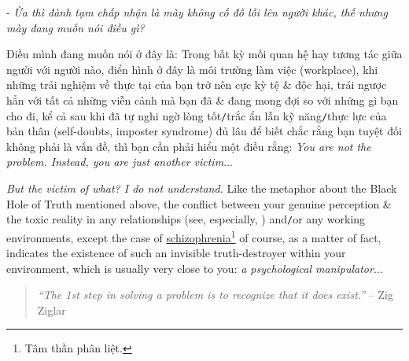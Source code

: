 \documentclass[12pt,twoside]{book}
\begin{document}
- {\it Ừa thì đành tạm chấp nhận là mày không cố đỗ lỗi lên người khác, thế nhưng mày đang muốn nói điều gì?}

Điều mình đang muốn nói ở đây là: Trong bất kỳ mối quan hệ hay tương tác giữa người với người nào, điển hình ở đây là môi trường làm việc (workplace), khi những trải nghiệm về thực tại của bạn trở nên cực kỳ tệ \& độc hại, trái ngược hẳn với tất cả những viễn cảnh mà bạn đã \& đang mong đợi so với những gì bạn cho đi, kể cả sau khi đã tự nghi ngờ lòng tốt{\tt/}trắc ẩn lẫn kỹ năng{\tt/}thực lực của bản thân (self-doubts, imposter syndrome) đủ lâu để biết chắc rằng bạn tuyệt đối không phải là vấn đề, thì bạn cần phải hiểu một điều rằng: {\it You are not the problem. Instead, you are just another victim}$\ldots$

{\it But the victim of what? I do not understand.} Like the metaphor about the Black Hole of Truth mentioned above, the conflict between your genuine perception \& the toxic reality in any relationships (see, especially, \cite{Bancroft_why_he_do,Bancroft_why_he_do_VN}) and{\tt/}or any working environments, except the case of \href{https://en.wikipedia.org/wiki/Schizophrenia}{schizophrenia}\footnote{Tâm thần phân liệt.} of course, as a matter of fact, indicates the existence of such an invisible truth-destroyer within your environment, which is usually very close to you: {\it a psychological manipulator}$\ldots$

\begin{quotation}
	{\it``The 1st step in solving a problem is to recognize that it does exist.''} -- {\sc Zig Ziglar}
\end{quotation}
\end{document}
